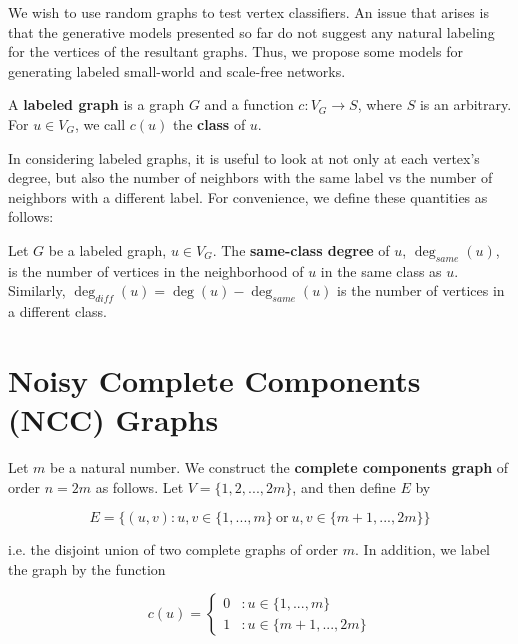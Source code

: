 We wish to use random graphs to test vertex classifiers. An issue that arises is that the generative
models presented so far do not suggest any natural labeling for the vertices of the resultant graphs.
Thus, we propose some models for generating labeled small-world and scale-free networks.

\begin{definition}
  A \textbf{labeled graph} is a graph $G$ and a function $c : V_G \to S$, where $S$ is an arbitrary.
  For $u \in V_G$, we call $c(u)$ the \textbf{class} of $u$.
\end{definition}

In considering labeled graphs, it is useful to look at not only at each vertex's degree, but also the
number of neighbors with the same label vs the number of neighbors with a different label. For
convenience, we define these quantities as follows:

\begin{definition}
  Let $G$ be a labeled graph, $u \in V_G$. The \textbf{same-class degree} of $u$, $\deg_{same}(u)$, is
  the number of vertices in the neighborhood of $u$ in the same class as $u$. Similarly, $\deg_{diff}(u) =
  \deg(u) - \deg_{same}(u)$ is the number of vertices in a different class.
\end{definition}


\section{Noisy Complete Components (NCC) Graphs}

\begin{definition}
  Let $m$ be a natural number. We construct the \textbf{complete components
    graph} of order $n = 2m$ as follows. Let $V = \{1,2, ..., 2m\}$, and then define
  $E$ by

  \[
    E = \{ (u,v) : u,v \in \{1,...,m\} ~\text{or}~ u,v \in \{m+1,...,2m\} \}
  \]

  i.e. the disjoint union of two complete graphs of order $m$. In addition, we label the graph by the
  function

  \[c(u) =
      \begin{cases}
        0 &: u \in \{1,...,m\} \\
        1 &: u \in \{m+1,...,2m\}
      \end{cases}
    \]
\end{definition}

